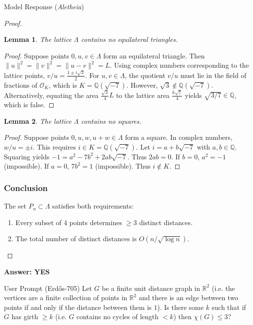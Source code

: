 \documentclass[11pt]{article}
\newtheorem{lemma}{Lemma}
\begin{document}
\begin{solution}{Model Response (\emph{Aletheia})}
\begin{proof}
\begin{lemma}
The lattice $\Lambda$ contains no equilateral triangles.
\end{lemma}
\begin{proof}
Suppose points $0, u, v \in \Lambda$ form an equilateral triangle. Then $\|u\|^2 = \|v\|^2 = \|u-v\|^2 = L$.
Using complex numbers corresponding to the lattice points, $v/u = \frac{1 \pm i\sqrt{3}}{2}$.
For $u, v \in \Lambda$, the quotient $v/u$ must lie in the field of fractions of $\mathcal{O}_K$, which is $K = \mathbb{Q}(\sqrt{-7})$.
However, $\sqrt{3} \notin \mathbb{Q}(\sqrt{-7})$. Alternatively, equating the area $\frac{\sqrt{3}}{4}L$ to the lattice area $\frac{k\sqrt{7}}{4}$ yields $\sqrt{3/7} \in \mathbb{Q}$, which is false.
\end{proof}

\begin{lemma}
The lattice $\Lambda$ contains no squares.
\end{lemma}
\begin{proof}
Suppose points $0, u, w, u+w \in \Lambda$ form a square. In complex numbers, $w/u = \pm i$.
This requires $i \in K = \mathbb{Q}(\sqrt{-7})$. Let $i = a + b\sqrt{-7}$ with $a, b \in \mathbb{Q}$.
Squaring yields $-1 = a^2 - 7b^2 + 2ab\sqrt{-7}$. Thus $2ab = 0$.
If $b=0$, $a^2 = -1$ (impossible). If $a=0$, $7b^2 = 1$ (impossible). Thus $i \notin K$.
\end{proof}

\subsubsection*{Conclusion}
The set $P_n \subset \Lambda$ satisfies both requirements:
\begin{enumerate}
    \item Every subset of 4 points determines $\ge 3$ distinct distances.
    \item The total number of distinct distances is $O(n/\sqrt{\log n})$.
\end{enumerate}
\end{proof}

\textbf{Answer: YES}
\end{solution}

\begin{problem}{User Prompt (Erd\H{o}s-705)}
Let $G$ be a finite unit distance graph in $\mathbb{R}^2$ (i.e. the vertices are a finite collection of points in $\mathbb{R}^2$ and there is an edge between two points if and only if the distance between them is $1$). Is there some $k$ such that if $G$ has girth $\geq k$ (i.e. $G$ contains no cycles of length $<k$) then $\chi(G)\leq 3$?
\end{problem}
\end{document}
